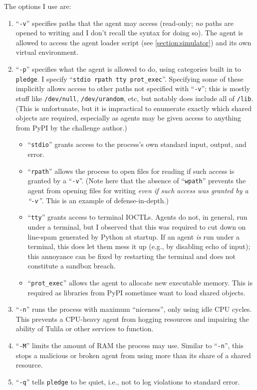 \documentclass[12pt]{article}
\begin{document}
The options I use are:
\begin{enumerate}
  \item ``\texttt{-v}'' specifies paths that the agent may access (read-only; \textit{no} paths are opened to writing and I don't recall the syntax for doing so). The agent is allowed to access the agent loader script (see \cref{section:simulator}) and its own virtual environment.
  \item ``\texttt{-p}'' specifies what the agent is allowed to do, using categories built in to \texttt{pledge}. I specify ``\texttt{stdio rpath tty prot\_exec}''. Specifying some of these implicitly allows access to other paths not specified with ``\texttt{-v}''; this is mostly stuff like \texttt{/dev/null}, \texttt{/dev/urandom}, etc, but notably does include all of \texttt{/lib}. (This is unfortunate, but it is impractical to enumerate exactly which shared objects are required, especially as agents may be given access to anything from PyPI by the challenge author.)
  \begin{itemize}[$\circ$]
    \item ``\texttt{stdio}'' grants access to the process's own standard input, output, and error.
    \item ``\texttt{rpath}'' allows the process to open files for reading if such access is granted by a ``\texttt{-v}''. (Note here that the absence of ``\texttt{wpath}'' prevents the agent from opening files for writing \textit{even if such access was granted by a ``\texttt{-v}''}. This is an example of defense-in-depth.)
    \item ``\texttt{tty}'' grants access to terminal IOCTLs. Agents do not, in general, run under a terminal, but I observed that this was required to cut down on line-spam generated by Python at startup. If an agent \textit{is} run under a terminal, this does let them mess it up (e.g., by disabling echo of input); this annoyance can be fixed by restarting the terminal and does not constitute a sandbox breach.
    \item ``\texttt{prot\_exec}'' allows the agent to allocate new executable memory. This is required as libraries from PyPI sometimes want to load shared objects.
  \end{itemize}
  \item ``\texttt{-n}'' runs the process with maximum ``niceness'', only using idle CPU cycles. This prevents a CPU-heavy agent from hogging resources and impairing the ability of Tulila or other services to function.
  \item ``\texttt{-M}'' limits the amount of RAM the process may use. Similar to ``\texttt{-n}'', this stops a malicious or broken agent from using more than its share of a shared resource.
  \item ``\texttt{-q}'' tells \texttt{pledge} to be quiet, i.e., not to log violations to standard error.
\end{enumerate}
\end{document}
